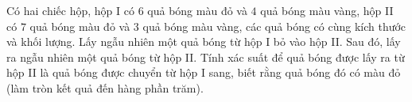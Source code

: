 \begin{ex}
Có hai chiếc hộp, hộp I có $6$ quả bóng màu đỏ và $4$ quả bóng màu vàng, hộp II có $7$ quả bóng màu đỏ và $3$ quả bóng màu vàng, các quả bóng có cùng kích thước và khối lượng. Lấy ngẫu nhiên một quả bóng từ hộp I bỏ vào hộp II. Sau đó, lấy ra ngẫu nhiên một quả bóng từ hộp II. Tính xác suất để quả bóng được lấy ra từ hộp II là quả bóng được chuyển từ hộp I sang, biết rằng quả bóng đó có màu đỏ (làm tròn kết quả đến hàng phần trăm).
\end{ex}

